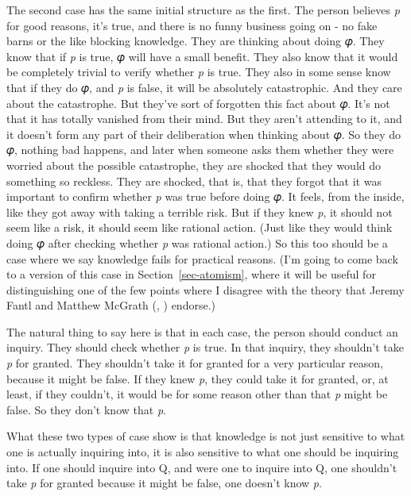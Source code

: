 \documentclass[
  12pt,
  letterpaper,
]{scrbook}
\begin{document}
The second case has the same initial structure as the first. The person
believes \emph{p} for good reasons, it's true, and there is no funny
business going on - no fake barns or the like blocking knowledge. They
are thinking about doing 𝜑. They know that if \emph{p} is true, 𝜑 will
have a small benefit. They also know that it would be completely trivial
to verify whether \emph{p} is true. They also in some sense know that if
they do 𝜑, and \emph{p} is false, it will be absolutely catastrophic.
And they care about the catastrophe. But they've sort of forgotten this
fact about 𝜑. It's not that it has totally vanished from their mind. But
they aren't attending to it, and it doesn't form any part of their
deliberation when thinking about 𝜑. So they do 𝜑, nothing bad happens,
and later when someone asks them whether they were worried about the
possible catastrophe, they are shocked that they would do something so
reckless. They are shocked, that is, that they forgot that it was
important to confirm whether \emph{p} was true before doing 𝜑. It feels,
from the inside, like they got away with taking a terrible risk. But if
they knew \emph{p}, it should not seem like a risk, it should seem like
rational action. (Just like they would think doing 𝜑 after checking
whether \emph{p} was rational action.) So this too should be a case
where we say knowledge fails for practical reasons. (I'm going to come
back to a version of this case in Section~\ref{sec-atomism}, where it
will be useful for distinguishing one of the few points where I disagree
with the theory that Jeremy Fantl and Matthew McGrath
(,
) endorse.)

The natural thing to say here is that in each case, the person should
conduct an inquiry. They should check whether \emph{p} is true. In that
inquiry, they shouldn't take \emph{p} for granted. They shouldn't take
it for granted for a very particular reason, because it might be false.
If they knew \emph{p}, they could take it for granted, or, at least, if
they couldn't, it would be for some reason other than that \emph{p}
might be false. So they don't know that \emph{p}.

What these two types of case show is that knowledge is not just
sensitive to what one is actually inquiring into, it is also sensitive
to what one should be inquiring into. If one should inquire into Q, and
were one to inquire into Q, one shouldn't take \emph{p} for granted
because it might be false, one doesn't know \emph{p}.~
\end{document}
